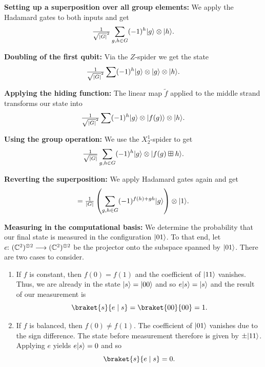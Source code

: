 \documentclass[a4paper, oneside, 12pt]{amsart}
\begin{document}
\begin{remark}
\begin{thmlist}
    \item \textbf{Setting up a superposition over all group elements:}
    We apply the Hadamard gates to both inputs and get
    \begin{equation*}
      \tfrac{1}{\sqrt{|G|}^{2}}\sum_{g, h \in G} (-1)^{h}\lvert g\rangle \otimes \lvert h\rangle.
    \end{equation*}
    \item \textbf{Doubling of the first qubit:}
    Via the \(Z\)-spider we get the state
    \begin{equation*}
      \tfrac{1}{\sqrt{|G|}^{2}} \sum (-1)^{h}\lvert g\rangle \otimes \lvert g\rangle \otimes \lvert h\rangle.
    \end{equation*}
    \item \textbf{Applying the hiding function:}
    The linear map \(\tilde{f}\) applied to the middle strand transforms our state into
    \begin{equation*}
      \tfrac{1}{\sqrt{|G|}^{2}} \sum (-1)^{h} \lvert g\rangle \otimes \lvert f(g)\rangle \otimes \lvert h\rangle.
    \end{equation*}
    \item \textbf{Using the group operation:}
    We use the \(X_{2}^{1}\)-spider to get
    \begin{equation*}
      \tfrac{1}{\sqrt{|G|}} \sum_{g,h\in G}(-1)^{h} \lvert g\rangle \otimes \lvert f(g) \boxplus h\rangle.
    \end{equation*}
    \item \textbf{Reverting the superposition:}
    We apply Hadamard gates again and get
    \begin{equation*}
      = \tfrac{1}{|G|} \left(\sum_{g,h\in G} (-1)^{f(h) +gh }\lvert g\rangle \right) \otimes \lvert1\rangle.
    \end{equation*}
    \item \textbf{Measuring in the computational basis:}
    We determine the probability that our final state is measured in the configuration \(\lvert01\rangle\).
    To that end, let \(e \from (\mathbb{C}^{2})^{\otimes 2}\to (\mathbb{C}^{2})^{\otimes 2}\) be the projector onto the subspace spanned by \(\lvert01\rangle\).
    There are two cases to consider.
    \begin{enumerate}
      \item If \(f\) is constant, then \(f(0) = f(1)\) and the coefficient of \(\lvert11\rangle\) vanishes.
      Thus, we are already in the state \(\lvert s\rangle=\lvert00\rangle\) and so \(e\lvert s\rangle = \lvert s\rangle \) and the result of our measurement is
      \begin{equation*}
        \braket{s}{e\mid s} = \braket{00}{00} = 1.
      \end{equation*}
      \item If \(f\) is balanced, then \(f(0) \neq f(1)\). The coefficient of \(\lvert01\rangle\) vanishes  due to the sign difference.
      The state before measurement therefore is given by \(\pm \lvert11\rangle\).
      Applying \(e\) yields \(e\lvert s\rangle = 0\) and so
      \begin{equation*}
        \braket{s}{e \mid s} = 0.
      \end{equation*}
    \end{enumerate}
  \end{thmlist}
\end{remark}
\end{document}
